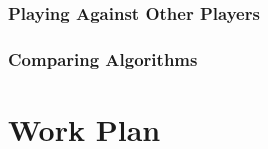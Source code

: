 \documentclass[a4paper, 12pt]{extreport}
\begin{document}
			\subsection{Playing Against Other Players}

			\subsection{Comparing Algorithms}
	
	\chapter{Work Plan}
		
	
	\printbibliography[heading={bibnumbered}, title={References}]
		
\end{document}
